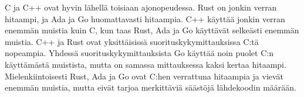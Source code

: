 C ja C++ ovat hyvin lähellä toisiaan ajonopeudessa. Rust on jonkin verran
hitaampi, ja Ada ja Go huomattavasti hitaampia. C++ käyttää jonkin verran
enemmän muistia kuin C, kun taas Rust, Ada ja Go käyttävät selkeästi enemmän
muistia. C++ ja Rust ovat yksittäisissä suorituskykymittauksissa C:tä
nopeampia. Yhdessä suorituskykymittauksista Go käyttää noin puolet C:n
käyttämästä muistista, mutta on samassa mittauksessa kaksi kertaa hitaampi.
Mielenkiintoisesti Rust, Ada ja Go ovat C:hen verrattuna hitaampia ja vievät
enemmän muistia, mutta eivät tarjoa merkittäviä säästöjä lähdekoodin määrään.
